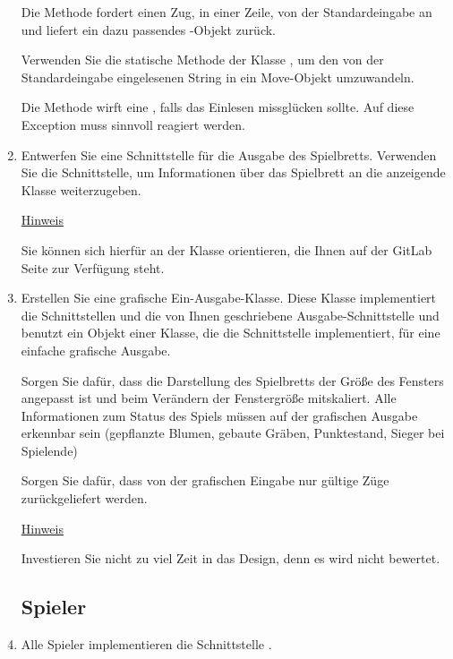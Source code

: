 \begin{enumerate}
Die Methode  fordert einen Zug, in einer Zeile, von der Standardeingabe an und liefert ein dazu passendes -Objekt zurück.

Verwenden Sie die statische Methode  der Klasse , um den von der Standardeingabe eingelesenen String in ein Move-Objekt umzuwandeln.

Die Methode  wirft eine , falls das Einlesen missglücken sollte. Auf diese Exception muss sinnvoll reagiert werden.

\item Entwerfen Sie eine Schnittstelle für die Ausgabe des Spielbretts. Verwenden Sie die  Schnittstelle, um Informationen über das Spielbrett an die anzeigende Klasse weiterzugeben.

\underline{Hinweis}

Sie können sich hierfür an der Klasse  orientieren, die Ihnen auf der GitLab Seite zur Verfügung steht.

\item Erstellen Sie eine grafische Ein-Ausgabe-Klasse. Diese Klasse implementiert die Schnittstellen  und die von Ihnen geschriebene Ausgabe-Schnittstelle und benutzt ein Objekt einer Klasse, die die Schnittstelle  implementiert, für eine einfache grafische Ausgabe.

Sorgen Sie dafür, dass die Darstellung des Spielbretts der Größe des Fensters angepasst ist und beim Verändern der Fenstergröße mitskaliert. Alle Informationen zum Status des Spiels müssen auf der grafischen Ausgabe erkennbar sein (gepflanzte Blumen, gebaute Gräben, Punktestand, Sieger bei Spielende)

Sorgen Sie dafür, dass von der grafischen Eingabe nur gültige Züge zurückgeliefert werden.

\underline{Hinweis}

Investieren Sie nicht zu viel Zeit in das Design, denn es wird nicht bewertet.
\newpage

\subsection*{Spieler}

\item Alle Spieler implementieren die Schnittstelle .


\end{enumerate}
